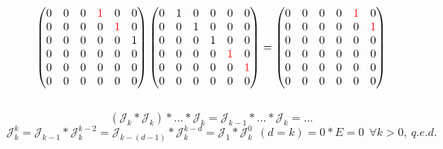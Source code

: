 \documentclass[14pt]{extarticle}
\begin{document}
\[\begin{pmatrix}
    0 & 0 & 0 & \textcolor{red}{1} & 0 & 0 \\
    0 & 0 & 0 & 0 & \textcolor{red}{1} & 0 \\
    0 & 0 & 0 & 0 & 0 & 1 \\
    0 & 0 & 0 & 0 & 0 & 0 \\
    0 & 0 & 0 & 0 & 0 & 0 \\
    0 & 0 & 0 & 0 & 0 & 0 \\
\end{pmatrix}
\begin{pmatrix}
    0 & 1 & 0 & 0 & 0 & 0 \\
    0 & 0 & 1 & 0 & 0 & 0 \\
    0 & 0 & 0 & 1 & 0 & 0 \\
    0 & 0 & 0 & 0 & \textcolor{red}{1} & 0 \\
    0 & 0 & 0 & 0 & 0 & \textcolor{red}{1} \\
    0 & 0 & 0 & 0 & 0 & 0 \\
\end{pmatrix} = 
\begin{pmatrix}
    0 & 0 & 0 & 0 & \textcolor{red}{1} & 0 \\
    0 & 0 & 0 & 0 & 0 & \textcolor{red}{1} \\
    0 & 0 & 0 & 0 & 0 & 0 \\
    0 & 0 & 0 & 0 & 0 & 0 \\
    0 & 0 & 0 & 0 & 0 & 0 \\
    0 & 0 & 0 & 0 & 0 & 0 \\
\end{pmatrix}
\] \\
$$ (\mathcal{J}_k * \mathcal{J}_k) * ... * \mathcal{J}_k 
= \mathcal{J}_{k-1}  * ... * \mathcal{J}_k = ...$$
$\mathcal{J}_k^k = \mathcal{J}_{k-1} * \mathcal{J}_k^{k-2} = 
\mathcal{J}_{k-(d-1)} * \mathcal{J}_k^{k-d} = 
\mathcal{J}_1 * \mathcal{J}_k^0 \ \ (d = k) = 0 * E = 0 \ \ \forall k > 0,
\ q.e.d.$
\end{document}
